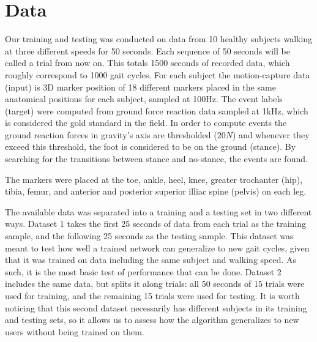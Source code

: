 \documentclass{acm_proc_article-sp}
\begin{document}
\section{Data}
\label{sec:Data}

Our training and testing was conducted on data from 10 healthy subjects walking at three different speeds for 50 seconds. Each sequence of 50 seconds will be called a trial from now on. This totals 1500 seconds of recorded data, which roughly correspond to 1000 gait cycles.  For each subject the motion-capture data (input) is 3D marker position of 18 different markers placed in the same anatomical positions for each subject, sampled at 100Hz. The event labels (target) were computed from ground force reaction data sampled at 1kHz, which is considered the gold standard in the field. In order to compute events the ground reaction forces in gravity's axis are thresholded ($20 N$) and whenever they exceed this threshold, the foot is considered to be on the ground (stance). By searching for the transitions between stance and no-stance, the events are found.

The markers were placed at the toe, ankle, heel, knee, greater trochanter (hip), tibia, femur, and anterior and posterior superior illiac spine (pelvis) on each leg.

The available data was separated into a training and a testing set in two different ways. Dataset 1 takes the first 25 seconds of data from each trial as the training sample, and the following 25 seconds as the testing sample. This dataset was meant to test how well a trained network can generalize to new gait cycles, given that it was trained on data including the same subject and walking speed. As such, it is the most basic test of performance that can be done. Dataset 2 includes the same data, but splits it along trials: all 50 seconds of 15 trials were used for training, and the remaining 15 trials were used for testing. It is worth noticing that this second dataset necessarily has different subjects in its training and testing sets, so it allows us to assess how the algorithm generalizes to new users without being trained on them.
\end{document}
